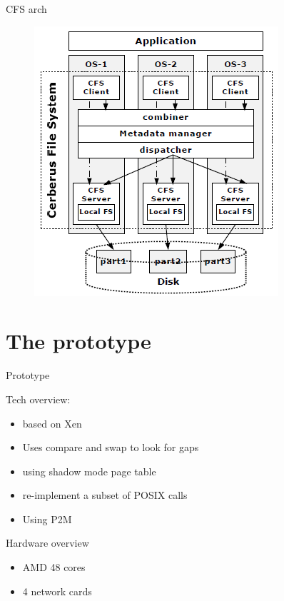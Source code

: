 \documentclass{beamer}
\begin{document}
	\begin{frame}{CFS arch}

		\begin{figure} [H]
			\centering
			\includegraphics[scale=0.40]{img/cerberus-cfs}
		\end{figure}	

	\end{frame}

\section{The prototype}

	\begin{frame}{Prototype}

	Tech overview:
	\begin{itemize}
	\item based on Xen
	\item Uses compare and swap to look for gaps
	\item using shadow mode page table
	\item re-implement a subset of POSIX calls
	\item Using P2M
	\end{itemize}
	
	Hardware overview
	\begin{itemize}
	\item AMD 48 cores
	\item 4 network cards
	\end{itemize}	
		
	\end{frame}
\end{document}
